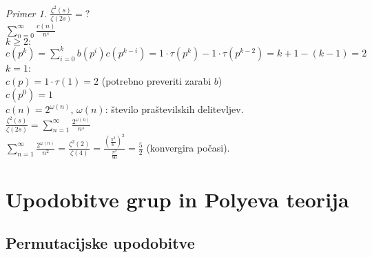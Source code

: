 \documentclass[a4paper, 12pt]{book}
\theoremstyle{definition}
\theoremstyle{remark}
\newtheorem*{ex}{Primer}
\begin{document}
\begin{ex}
  $\frac{\zeta^2(s)}{\zeta(2s)} = ?$ \\
  $\sum_{n=0}^{\infty} \frac{c(n)}{n^s}$ \\
  $k \geq 2:$ \\
  $c(p^k) = \sum_{i=0}^{k} b(p^i) c(p^{k-i}) = 1 \cdot \tau(p^k) - 1 \cdot \tau(p^{k-2}) = k+1-(k-1) = 2$ \\
  $k = 1$: \\
  $c(p) = 1 \cdot \tau(1) = 2$ (potrebno preveriti zarabi $b$) \\
  $c(p^0) = 1$ \\
  $c(n) = 2^{\omega(n)}$, $\omega(n)$: število praštevilskih delitevljev. \\
  $\frac{\zeta^2(s)}{\zeta(2s)} = \sum_{n=1}^{\infty} \frac{2^{\omega(n)}}{n^s}$ \\
  $\sum_{n=1}^{\infty} \frac{2^{\omega(n)}}{n^2} = \frac{\zeta^2(2)}{\zeta(4)}
  = \frac{\left(\frac{\pi^2}{6}\right)^2}{\frac{\pi^2}{90}} = \frac{5}{2}$ (konvergira počasi).
\end{ex}



\chapter{Upodobitve grup in Polyeva teorija}


\section{Permutacijske upodobitve}
\end{document}
